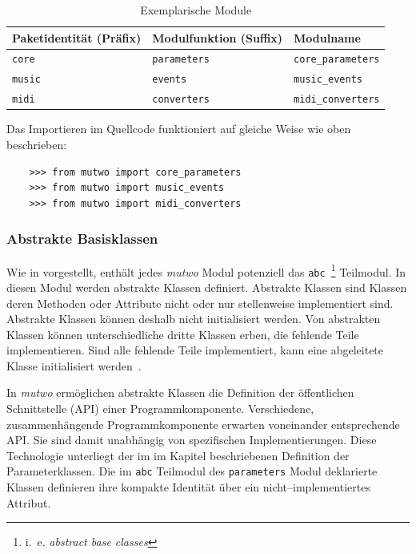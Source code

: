 \documentclass[12pt,a4paper,ngerman]{article}
\begin{document}
\begin{table}[H]
    \begin{center}
        \begin{tabular}{l l l}
            \hline
            Paketidentität (Präfix) & Modulfunktion (Suffix) & Modulname \\ [0.5ex] 
            \hline\hline
            \texttt{core} & \texttt{parameters} & \texttt{core\_parameters} \\
            \texttt{music} & \texttt{events} & \texttt{music\_events} \\
            \texttt{midi} & \texttt{converters} & \texttt{midi\_converters} \\
            \hline
        \end{tabular}
    \end{center}

    \caption{Exemplarische Module}
\end{table}

Das Importieren im Quellcode funktioniert auf gleiche Weise wie oben beschrieben:

\begin{lstlisting}
    >>> from mutwo import core_parameters
    >>> from mutwo import music_events
    >>> from mutwo import midi_converters
\end{lstlisting}

\subsubsection{Abstrakte Basisklassen}
\label{abstractBaseClasses}

Wie in \emph{} vorgestellt, enthält jedes \emph{mutwo} Modul potenziell das \texttt{abc}~\footnote{%
    i.\ e. \emph{abstract base classes}%
} Teilmodul.
In diesen Modul werden abstrakte Klassen definiert.
Abstrakte Klassen sind Klassen deren Methoden oder Attribute nicht oder nur stellenweise implementiert sind.
Abstrakte Klassen können deshalb nicht initialisiert werden.
Von abstrakten Klassen können unterschiedliche dritte Klassen erben, die fehlende Teile implementieren.
Sind alle fehlende Teile implementiert, kann eine abgeleitete Klasse initialisiert werden~\parencite{abstractTypeWiki}.

\bigskip

In \emph{mutwo} ermöglichen abstrakte Klassen die Definition der öffentlichen Schnittstelle (API) einer Programmkomponente.
Verschiedene, zusammenhängende Programmkomponente erwarten voneinander entsprechende API.
Sie sind damit unabhängig von spezifischen Implementierungen.
Diese Technologie unterliegt der im im Kapitel \emph{} beschriebenen Definition der Parameterklassen.
Die im \texttt{abc} Teilmodul des \texttt{parameters} Modul deklarierte Klassen definieren ihre kompakte Identität über ein nicht--implementiertes Attribut.
\end{document}
